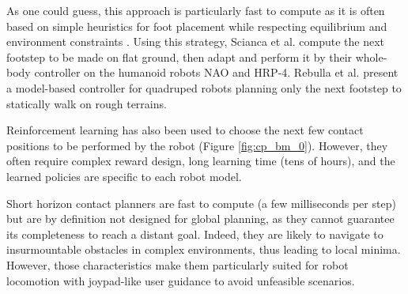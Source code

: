 As one could guess, this approach is particularly fast to compute as it is often based on simple heuristics for foot placement while respecting equilibrium and environment constraints \cite{raibert_heuritics_1986}.
Using this strategy, Scianca et al. \cite{Scianca_2020} compute the next footstep to be made on flat ground, then adapt and perform it by their whole-body controller on the humanoid robots NAO and HRP-4.
Rebulla et al. \cite{rebula_2007_little_dog} present a model-based controller for quadruped robots planning only the next footstep to statically walk on rough terrains.

Reinforcement learning has also been used to choose the next few contact positions to be performed by the robot \cite{deepGait, RLOC} (Figure \ref{fig:cp_bm_0}). However, they often require complex reward design, long learning time (tens of hours), and the learned policies are specific to each robot model.

Short horizon contact planners are fast to compute (a few milliseconds per step) but are by definition not designed for global planning, as they cannot guarantee its completeness to reach a distant goal. 
Indeed, they are likely to navigate to insurmountable obstacles in complex environments, thus leading to local minima.
However, those characteristics make them particularly suited for robot locomotion with joypad-like user guidance to avoid unfeasible scenarios.


